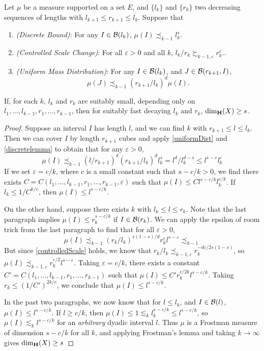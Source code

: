 \begin{theorem} \label{uniformHausdorffResult}
    Let $\mu$ be a measure supported on a set $E$, and $\{ l_k \}$ and $\{ r_k \}$ two decreasing sequences of lengths with $l_{k+1} \leq r_{k+1} \leq l_k$. Suppose that
    \begin{enumerate}
    	\item \label{discreteBound} \emph{(Discrete Bound)}: For any $I \in \operatorname{\mathcal{B}}(l_k)$, $\mu(I) \precsim_{k-1} l_k^s$.
    	\item \label{controlledScale} \emph{(Controlled Scale Change)}: For all $\varepsilon > 0$ and all $k$, $l_k/r_k \succsim_{k-1,\varepsilon} r_k^\varepsilon$..
    	\item \label{uniformDist} \emph{(Uniform Mass Distribution)}: For any $I \in \operatorname{\mathcal{B}}(l_k)$, and $J \in \operatorname{\mathcal{B}}(r_{k+1},I)$,
    	\[ \mu(J) \precsim_{k-1} (r_{k+1}/l_k)^d \mu(I). \]
    \end{enumerate}
	If, for each $k$, $l_k$ and $r_k$ are suitably small, depending only on $l_1, \dots, l_{k-1}, r_1, \dots, r_{k-1}$, then for suitably fast decaying $l_k$ and $r_k$, $\operatorname{\dim_{\mathbf{H}}}(X) \geq s$.
\end{theorem}
\begin{proof}
	Suppose an interval $I$ has length $l$, and we can find $k$ with $r_{k+1} \leq l \leq l_k$. Then we can cover $I$ by length $r_{k+1}$ cubes and apply \ref{uniformDist} and \ref{discretelemma} to obtain that for any $\varepsilon > 0$,
    \[ \mu(I) \precsim_{k-1} (l/r_{k+1})^d (r_{k+1}/l_k)^d l_k^s = l^d / l_k^{d-s} \leq l^{s-\varepsilon} l_k^\varepsilon \]
    If we set $\varepsilon = c/k$, where $c$ is a small constant such that $s - c/k > 0$, we find there exists $C = C(l_1,\dots,l_{k-1},r_1,\dots,r_{k-1},\varepsilon)$ such that $\mu(I) \leq C l^{s - c/k} l_k^{c/k}$. If $l_k \leq 1/C^{k/c}$, then $\mu(I) \leq l^{s - c/k}$.

    On the other hand, suppose there exists $k$ with $l_k \leq l \leq r_k$. Note that the last paragraph implies $\mu(I) \leq r_k^{s - c/k}$ if $I \in \operatorname{\mathcal{B}}(r_k)$. We can apply the epsilon of room trick from the last paragraph to find that for all $\varepsilon > 0$,
%
	\[ \mu(I) \precsim_{k-1} \left( r_k/l_k \right)^{s(1 - s)/d} r_k^\varepsilon l^{s - \varepsilon} \precsim_{k-1} \]
	But since \ref{controlledScale} holds, we know that $r_k/l_k \precsim_{k-1,\varepsilon} r_k^{- d\varepsilon/2s(1-s)}$, so $\mu(I) \precsim_{k-1,\varepsilon} r_k^{\varepsilon/2} l^{s-\varepsilon}$. Taking $\varepsilon = c/k$, there exists a constant $C' = C(l_1, \dots, l_{k-1}, r_1, \dots, r_{k-1})$ such that $\mu(I) \leq C' r_k^{c/2k} l^{s-c/k}$. Taking $r_k \leq (1/C')^{2k/c}$, we conclude that $\mu(I) \leq l^{s-c/k}$.

	In the past two paragraphs, we now know that for $l \leq l_k$, and $I \in \operatorname{\mathcal{B}}(l)$, $\mu(I) \leq l^{s-c/k}$. If $l \geq c/k$, then $\mu(I) \leq 1 \lesssim_k l_k^{s - c/k} \leq l^{s - c/k}$, so $\mu(I) \lesssim_k l^{s - c/k}$ for an {\it arbitrary} dyadic interval $l$. Thus $\mu$ is a Frostman measure of dimension $s - c/k$ for all $k$, and applying Frostman's lemma and taking $k \to \infty$ gives $\operatorname{\dim_{\mathbf{H}}}(X) \geq s$
\end{proof}

